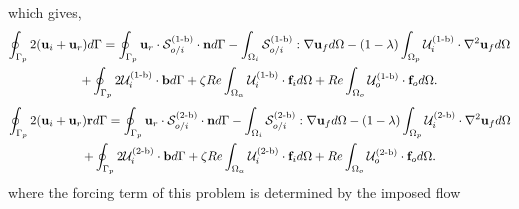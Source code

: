 which gives, 
\begin{multline}
    \intS[p]{2(\textbf{u}_{i} + \textbf{u}_r)}
    =
    \intS[p]{\textbf{u}_{r}\cdot \mathcal{S}^\text{(1-b)}_{o/i} \cdot \textbf{n}}
    - \intO[i]{\mathcal{S}^\text{(1-b)}_{o/i} :\grad\textbf{u}_f}
    - (1-\lambda) \intO[p]{\mathcal{U}^\text{(1-b)}_{i} \cdot \grad^2 \textbf{u}_f }\\
    + \intS[p]{2 \mathcal{U}^\text{(1-b)}_{i}  \cdot  \textbf{b}}
    + \zeta Re \intO{\mathcal{U}^\text{(1-b)}_{i} \cdot \textbf{f}_{i}} 
    + Re\intO[o]{\mathcal{U}^\text{(1-b)}_{o}\cdot \textbf{f}_{o}}.
    \label{eq:int_final_step}
\end{multline}
\begin{multline}
    \intS[p]{2(\textbf{u}_{i} + \textbf{u}_r)\textbf{r}}
    =
    \intS[p]{\textbf{u}_{r}\cdot \mathcal{S}^\text{(2-b)}_{o/i} \cdot \textbf{n}}
    - \intO[i]{\mathcal{S}^\text{(2-b)}_{o/i} :\grad\textbf{u}_f}
    - (1-\lambda) \intO[p]{\mathcal{U}^\text{(2-b)}_{i} \cdot \grad^2 \textbf{u}_f }\\
    + \intS[p]{2\mathcal{U}^\text{(2-b)}_{i} \cdot  \textbf{b}}
    + \zeta Re \intO{\mathcal{U}^\text{(2-b)}_{i} \cdot \textbf{f}_{i}} 
    + Re\intO[o]{\mathcal{U}^\text{(2-b)}_{o}\cdot \textbf{f}_{o}}.
    \label{eq:un}
\end{multline}
where the forcing term of this problem is determined by the imposed flow

